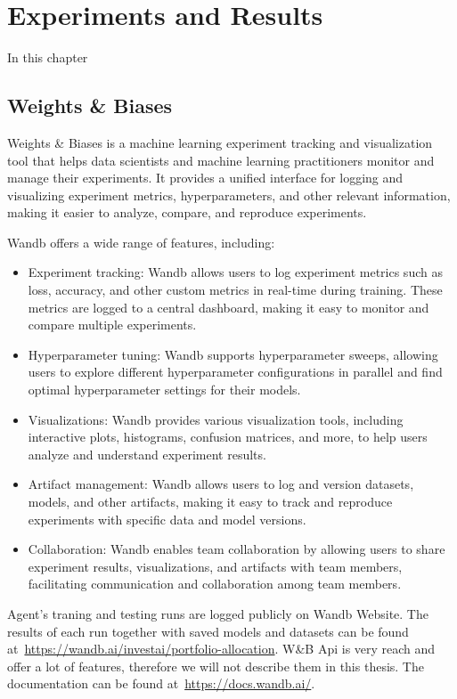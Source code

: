\documentclass[../xlapes02]{subfiles}
\begin{document}
    \chapter{Experiments and Results}\label{sec:experiments-and-results}
    In this chapter


    \section{Weights \& Biases}\label{subsubsec:wandb}
    Weights \& Biases is a machine learning experiment tracking and visualization tool that helps data scientists and machine learning practitioners monitor and manage their experiments. It provides a unified interface for logging and visualizing experiment metrics, hyperparameters, and other relevant information, making it easier to analyze, compare, and reproduce experiments.

    Wandb offers a wide range of features, including:
    \begin{itemize}
        \item Experiment tracking: Wandb allows users to log experiment metrics such as loss, accuracy, and other custom metrics in real-time during training. These metrics are logged to a central dashboard, making it easy to monitor and compare multiple experiments.
        \item Hyperparameter tuning: Wandb supports hyperparameter sweeps, allowing users to explore different hyperparameter configurations in parallel and find optimal hyperparameter settings for their models.
        \item Visualizations: Wandb provides various visualization tools, including interactive plots, histograms, confusion matrices, and more, to help users analyze and understand experiment results.
        \item Artifact management: Wandb allows users to log and version datasets, models, and other artifacts, making it easy to track and reproduce experiments with specific data and model versions.
        \item Collaboration: Wandb enables team collaboration by allowing users to share experiment results, visualizations, and artifacts with team members, facilitating communication and collaboration among team members.
    \end{itemize}

    Agent's traning and testing runs are logged publicly on Wandb Website. The results of each run together with saved models and datasets can be found at~\url{https://wandb.ai/investai/portfolio-allocation}.
    W\&B Api is very reach and offer a lot of features, therefore we will not describe them in this thesis. The documentation can be found at~\url{https://docs.wandb.ai/}.
\end{document}
